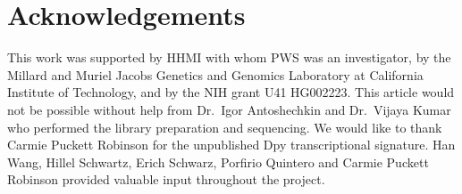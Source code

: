 \documentclass[10pt, twocolumn]{article}
\begin{document}
\section*{Acknowledgements}
This work was supported by HHMI with whom PWS was an investigator, by the
Millard and Muriel Jacobs Genetics and Genomics Laboratory at California
Institute of Technology, and by the NIH grant U41 HG002223. This article
would not be possible without help from Dr.\ Igor Antoshechkin and Dr.\ Vijaya
Kumar who performed the library preparation and sequencing. We would like to
thank Carmie Puckett Robinson for the unpublished Dpy transcriptional
signature. Han Wang, Hillel Schwartz, Erich Schwarz, Porfirio Quintero and
Carmie Puckett Robinson provided valuable input throughout the project.



\end{document}
